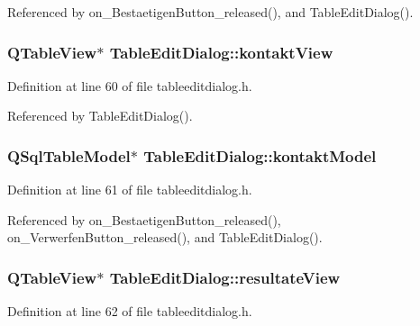 Referenced by on\_\-BestaetigenButton\_\-released(), and TableEditDialog().\hypertarget{class_table_edit_dialog_a6e15d4f17c02c81f8a1221ed1e789b5}{
\subsubsection[kontaktView]{\setlength{\rightskip}{0pt plus 5cm}QTableView$\ast$ {\bf TableEditDialog::kontaktView}}}
\label{class_table_edit_dialog_a6e15d4f17c02c81f8a1221ed1e789b5}




Definition at line 60 of file tableeditdialog.h.

Referenced by TableEditDialog().\hypertarget{class_table_edit_dialog_2bccfca0a956c1fe7e4272e435456b8e}{
\subsubsection[kontaktModel]{\setlength{\rightskip}{0pt plus 5cm}QSqlTableModel$\ast$ {\bf TableEditDialog::kontaktModel}}}
\label{class_table_edit_dialog_2bccfca0a956c1fe7e4272e435456b8e}




Definition at line 61 of file tableeditdialog.h.

Referenced by on\_\-BestaetigenButton\_\-released(), on\_\-VerwerfenButton\_\-released(), and TableEditDialog().\hypertarget{class_table_edit_dialog_3ae273e36ee898643059e8963ed9f557}{
\subsubsection[resultateView]{\setlength{\rightskip}{0pt plus 5cm}QTableView$\ast$ {\bf TableEditDialog::resultateView}}}
\label{class_table_edit_dialog_3ae273e36ee898643059e8963ed9f557}




Definition at line 62 of file tableeditdialog.h.

